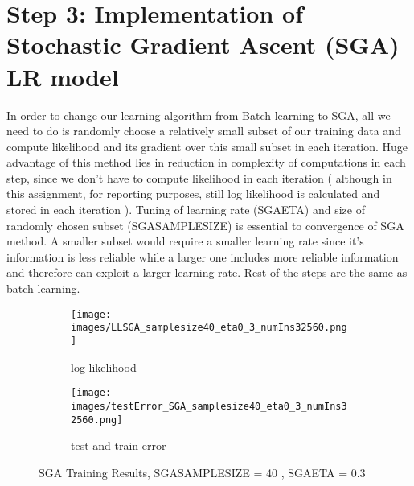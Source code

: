 \documentclass[a4paper,11pt]{article}
\begin{document}
\section*{Step 3: Implementation of Stochastic Gradient Ascent (SGA) LR model}
In order to change our learning algorithm from Batch learning to SGA, all we need to do is randomly choose a relatively small subset of our training data and compute likelihood and its gradient over this small subset in each iteration. Huge advantage of this method lies in reduction in complexity of computations in each step, since we don't have to compute likelihood in each iteration ( although in this assignment, for reporting purposes, still log likelihood is calculated and stored in each iteration ). Tuning of learning rate (SGA\underline{\hspace{.2cm}}ETA) and size of randomly chosen subset (SGA\underline{\hspace{.2cm}}SAMPLE\underline{\hspace{.2cm}}SIZE) is essential to convergence of SGA method. A smaller subset would require a smaller learning rate since it's information is less reliable while a larger one includes more reliable information and therefore can exploit a larger learning rate. Rest of the steps are the same as batch learning. \\ 
\begin{figure}[t]
\begin{subfigure}{.5\textwidth}
  \texttt{[image: images/LLSGA\_samplesize40\_eta0\_3\_numIns32560.png]}
	\centering
  \caption{log likelihood }
  \label{fig:SGA40_loglikelihood}
\end{subfigure}
\begin{subfigure}{.5\textwidth}
  \texttt{[image: images/testError\_SGA\_samplesize40\_eta0\_3\_numIns32560.png]}
	\centering
  \caption{test and train error }
  \label{fig:SGA40_errors}
\end{subfigure}
  \caption{SGA Training Results, SGA\underline{\hspace{.2cm}}SAMPLE\underline{\hspace{.2cm}}SIZE = 40 , SGA\underline{\hspace{.2cm}}ETA = 0.3}
  \label{fig:SGA40}
\end{figure}
\end{document}
